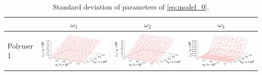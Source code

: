 \documentclass[11pt,a4paper]{article}
\theoremstyle{definition}
\begin{document}
\begin{table}[h]
  \centering
  \footnotesize
  \caption{Standard deviation of parameters of \eqref{eq:model_0}.}
  \begin{tabular}{l | c c c}
	  & $\omega_1$ & $\omega_2$ & $\omega_3$ \\ \hline
	\begin{rotate}{90}Polymer 1\end{rotate} &	\includegraphics[scale=0.4]{figs/even/p1.txt_coeff0.dat.eps} & \includegraphics[scale=0.4]{figs/even/p1.txt_coeff1.dat.eps} & \includegraphics[scale=0.4]{figs/even/p1.txt_coeff2.dat.eps} \\

\end{tabular}
\end{table}
\end{document}
